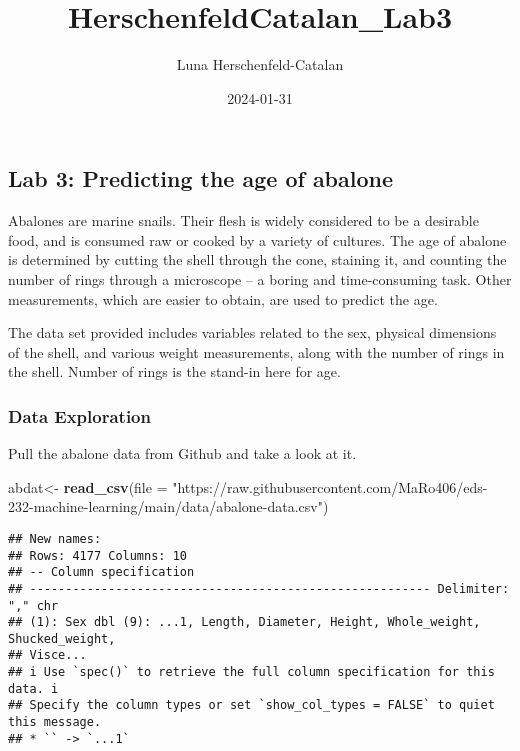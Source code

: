 \documentclass[
]{article}
\title{HerschenfeldCatalan\_Lab3}
\author{Luna Herschenfeld-Catalan}
\date{2024-01-31}
\newenvironment{Shaded}{\begin{snugshade}}{\end{snugshade}}
\newcommand{\AttributeTok}[1]{\textcolor[rgb]{0.13,0.29,0.53}{#1}}
\newcommand{\FunctionTok}[1]{\textcolor[rgb]{0.13,0.29,0.53}{\textbf{#1}}}
\newcommand{\NormalTok}[1]{#1}
\newcommand{\OtherTok}[1]{\textcolor[rgb]{0.56,0.35,0.01}{#1}}
\newcommand{\StringTok}[1]{\textcolor[rgb]{0.31,0.60,0.02}{#1}}
\begin{document}
\maketitle

\hypertarget{lab-3-predicting-the-age-of-abalone}{%
\subsection{Lab 3: Predicting the age of
abalone}\label{lab-3-predicting-the-age-of-abalone}}

Abalones are marine snails. Their flesh is widely considered to be a
desirable food, and is consumed raw or cooked by a variety of cultures.
The age of abalone is determined by cutting the shell through the cone,
staining it, and counting the number of rings through a microscope -- a
boring and time-consuming task. Other measurements, which are easier to
obtain, are used to predict the age.

The data set provided includes variables related to the sex, physical
dimensions of the shell, and various weight measurements, along with the
number of rings in the shell. Number of rings is the stand-in here for
age.

\hypertarget{data-exploration}{%
\subsubsection{Data Exploration}\label{data-exploration}}

Pull the abalone data from Github and take a look at it.

\begin{Shaded}
\begin{Highlighting}[]
\NormalTok{abdat}\OtherTok{\textless{}{-}} \FunctionTok{read\_csv}\NormalTok{(}\AttributeTok{file =} \StringTok{"https://raw.githubusercontent.com/MaRo406/eds{-}232{-}machine{-}learning/main/data/abalone{-}data.csv"}\NormalTok{)}
\end{Highlighting}
\end{Shaded}

\begin{verbatim}
## New names:
## Rows: 4177 Columns: 10
## -- Column specification
## -------------------------------------------------------- Delimiter: "," chr
## (1): Sex dbl (9): ...1, Length, Diameter, Height, Whole_weight, Shucked_weight,
## Visce...
## i Use `spec()` to retrieve the full column specification for this data. i
## Specify the column types or set `show_col_types = FALSE` to quiet this message.
## * `` -> `...1`
\end{verbatim}
\end{document}
